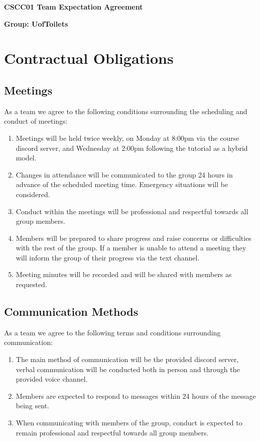 \documentclass{article}
\begin{document}
\begin{center}{\Large\textbf{CSCC01 Team Expectation Agreement}}\end{center}
\begin{center}{\large{\textbf{Group: UofToilets}}}\end{center}

\section{Contractual Obligations}
    \subsection{Meetings}
        As a team we agree to the following conditions surrounding the scheduling and conduct of meetings:
        \begin{enumerate}
            \item Meetings will be held twice weekly, on Monday at 8:00pm via the course discord server, and Wednesday at 2:00pm following the tutorial as a hybrid model.
            \item Changes in attendance will be communicated to the group 24 hours in advance of the scheduled meeting time. Emergency situations will be considered.
            \item Conduct within the meetings will be professional and respectful towards all group members.
            \item Members will be prepared to share progress and raise concerns or difficulties with the rest of the group. If a member is unable to attend a meeting they will inform the group of their progress via the text channel.
            \item Meeting minutes will be recorded and will be shared with members as requested.
        \end{enumerate}
    \subsection{Communication Methods}
        As a team we agree to the following terms and conditions surrounding communication:
        \begin{enumerate}
            \item The main method of communication will be the provided discord server, verbal communication will be conducted both in person and through the provided voice channel.
            \item Members are expected to respond to messages within 24 hours of the message being sent.
            \item When communicating with members of the group, conduct is expected to remain professional and respectful towards all group members.
        \end{enumerate}
\end{document}
